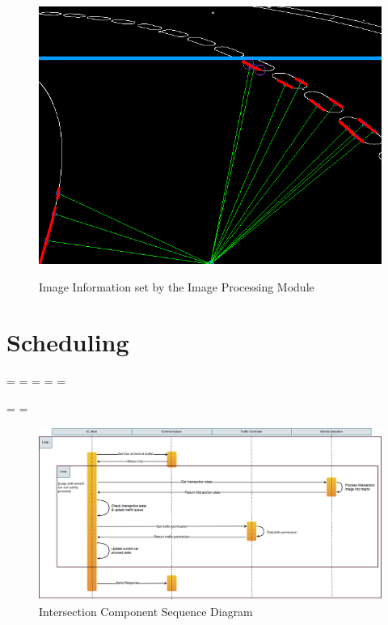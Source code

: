 \documentclass [10pt]{article}
\begin{document}
\begin{figure} [h!]
	\caption{Image Information set by the Image Processing Module}
	\centering
	\includegraphics [scale=0.8] {figures/left_h.png}
	\label{fig:ImageData Example}
\end{figure}







\section{Scheduling}

\newpage
\pagestyle{fancy}

\paperwidth=\pdfpageheight
\paperheight=\pdfpagewidth
\pdfpageheight=\paperheight
\pdfpagewidth=\paperwidth
\headwidth=\textheight


\begingroup

\vsize=\textwidth
\hsize=\textheight



\break
\begin {figure}[h!]
\centering
\caption{Intersection Component Sequence Diagram} \vspace{4mm} \hspace*{-2cm}
\includegraphics [scale = .36, angle = 0, trim={0 0 0 0},clip] {figures/IC_Sequence_Diagram.pdf}

\end{figure}
\end{document}
